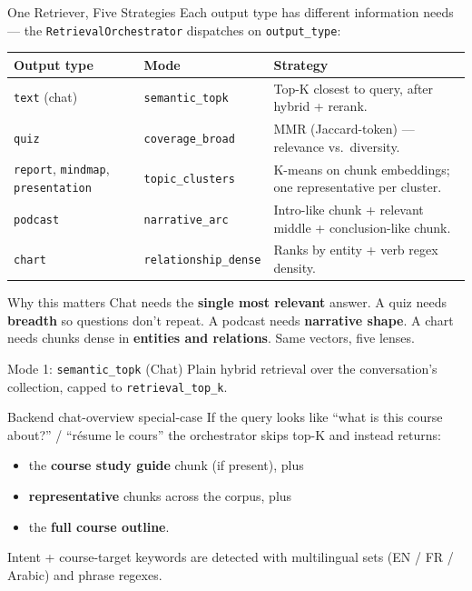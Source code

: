 \documentclass[aspectratio=169, 10pt]{beamer}
\begin{document}
\begin{frame}{One Retriever, Five Strategies}
  \scriptsize
  Each output type has different information needs --- the
  \texttt{RetrievalOrchestrator} dispatches on \texttt{output\_type}:

  \vspace{0.1cm}
  \renewcommand{\arraystretch}{1.3}
  \begin{tabular}{p{2.0cm} p{2.4cm} p{8.5cm}}
    \toprule
    \rowcolor{eduBlue!20}\textbf{Output type} & \textbf{Mode} & \textbf{Strategy} \\
    \midrule
    \texttt{text} (chat)            & \texttt{semantic\_topk}     & Top-K closest to query, after hybrid + rerank. \\
    \texttt{quiz}                   & \texttt{coverage\_broad}    & MMR (Jaccard-token) --- relevance vs.\ diversity. \\
    \texttt{report}, \texttt{mindmap}, \texttt{presentation}
                                    & \texttt{topic\_clusters}    & K-means on chunk embeddings; one representative per cluster. \\
    \texttt{podcast}                & \texttt{narrative\_arc}     & Intro-like chunk + relevant middle + conclusion-like chunk. \\
    \texttt{chart}                  & \texttt{relationship\_dense}& Ranks by entity + verb regex density. \\
    \bottomrule
  \end{tabular}

  \vspace{0.2cm}
  \begin{block}{Why this matters}
    Chat needs the \textbf{single most relevant} answer. A quiz needs
    \textbf{breadth} so questions don't repeat. A podcast needs
    \textbf{narrative shape}. A chart needs chunks dense in
    \textbf{entities and relations}. Same vectors, five lenses.
  \end{block}
\end{frame}

\begin{frame}{Mode 1: \texttt{semantic\_topk} (Chat)}
  \scriptsize
  Plain hybrid retrieval over the conversation's collection, capped to
  \texttt{retrieval\_top\_k}.

  \begin{exampleblock}{Backend chat-overview special-case}
    \scriptsize
    If the query looks like ``what is this course about?'' / ``r\'esume
    le cours'' the orchestrator skips top-K and instead returns:
    \begin{itemize}
      \setlength\itemsep{0pt}
      \item the \textbf{course study guide} chunk (if present), plus
      \item \textbf{representative} chunks across the corpus, plus
      \item the \textbf{full course outline}.
    \end{itemize}
    Intent + course-target keywords are detected with multilingual sets
    (EN / FR / Arabic) and phrase regexes.
  \end{exampleblock}
\end{frame}
\end{document}
